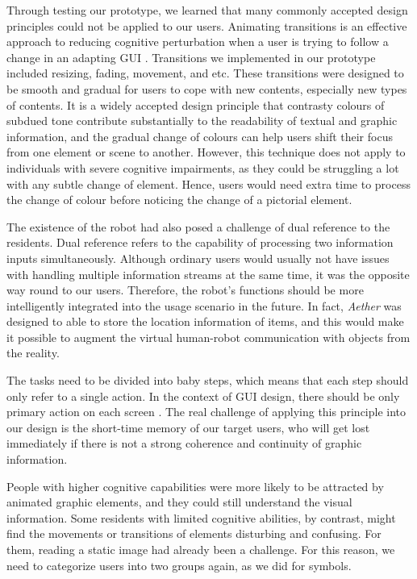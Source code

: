 \documentclass[letterpaper, 10 pt, conference]{ieeeconf}  %
\begin{document}
Through testing our prototype, we learned that many commonly accepted design principles could not be applied to our users. Animating transitions is an effective approach to reducing cognitive perturbation when a user is trying to follow a change in an adapting GUI \cite{Dessart2011}. Transitions we implemented in our prototype included resizing, fading, movement, and etc. These  transitions were designed to be smooth and gradual for users to cope with new contents, especially new types of contents. It is a widely accepted design principle that contrasty colours of subdued tone contribute substantially to the readability of textual and graphic information, and the gradual change of colours can help users shift their focus from one element or scene to another. However, this technique does not apply to individuals with severe cognitive impairments, as they could be struggling a lot with any subtle change of element. Hence, users would need extra time to process the change of colour before noticing the change of a pictorial element. 

The existence of the robot had also posed a challenge of dual reference to the residents. Dual reference refers to the capability of processing two information inputs simultaneously. Although ordinary users would usually not have issues with handling multiple information streams at the same time, it was the opposite way round to our users. Therefore, the robot's functions should be more intelligently integrated into the usage scenario in the future. In fact, \textit{Aether} was designed to able to store the location information of items, and this would make it possible to augment the virtual human-robot communication with objects from the reality.

The tasks need to be divided into baby steps, which means that each step should only refer to a single action. In the context of GUI design, there should be only primary action on each screen \cite{Interface}. The real challenge of applying this principle into our design is the short-time memory of our target users, who will get lost immediately if there is not a strong coherence and continuity of graphic information.

People with higher cognitive capabilities were more likely to be attracted by animated graphic elements, and they could still understand the visual information. Some residents with limited cognitive abilities, by contrast, might find the movements or transitions of elements disturbing and confusing. For them, reading a static image had already been a challenge. For this reason, we need to categorize users into two groups again, as we did for symbols.
\end{document}
